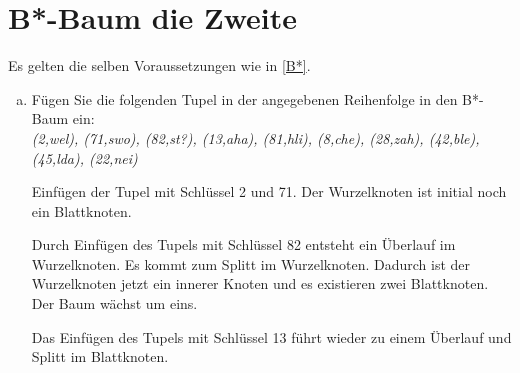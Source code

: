 \section{B*-Baum die Zweite}

Es gelten die selben Voraussetzungen wie in \ref{B*}.

\begin{enumerate}[a)]
	\item Fügen Sie die folgenden Tupel in der angegebenen Reihenfolge in den B*-Baum ein:\\
\textit{(2,wel), (71,swo), (82,st?), (13,aha), (81,hli), (8,che), (28,zah), (42,ble), (45,lda), (22,nei)
}
\begin{note}
	Einfügen der Tupel mit Schlüssel 2 und 71. Der Wurzelknoten ist initial noch ein Blattknoten.

	\begin{center}
	\end{center}

Durch Einfügen des Tupels mit Schlüssel 82 entsteht ein Überlauf im Wurzelknoten.
Es kommt zum Splitt im Wurzelknoten.
Dadurch ist der Wurzelknoten jetzt ein innerer Knoten und es existieren zwei Blattknoten.
Der Baum wächst um eins.

	\begin{center}
	\end{center}

Das Einfügen des Tupels mit Schlüssel 13 führt wieder zu einem Überlauf und Splitt im Blattknoten.

	\begin{center}
		\begin{tikzpicture}[
		start chain=0 going right,
		start chain=1 going right,
		defaultNode/.style={defaultNode1},
		]


\end{tikzpicture}
\end{center}
\end{note}
\end{enumerate}
